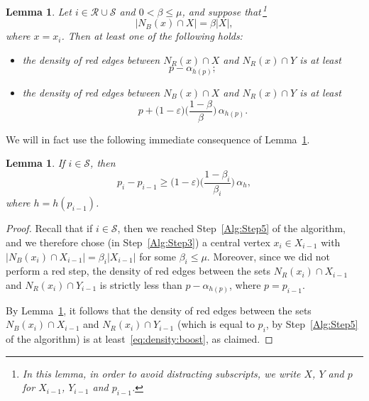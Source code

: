 \documentclass[12pt,reqno]{amsart}
\newtheorem{lemma}[theorem]{Lemma}
\theoremstyle{definition}
\theoremstyle{remark}
\def\cS{\mathcal{S}}
\newcommand\eps{\varepsilon}
\renewcommand{\le}{\leqslant}
\renewcommand{\ge}{\geqslant}
\def\eps{\varepsilon}
\def\cR{\mathcal{R}}
\begin{document}
\begin{lemma}\label{lem:density:boost:steps:boost:the:density}
Let $i \in \cR \cup \cS$ and $0 < \beta \le \mu$, and suppose that\,\footnote{In this lemma, in order to avoid distracting subscripts, we write $X$, $Y$ and $p$ for $X_{i-1}$, $Y_{i-1}$ and $p_{i-1}$.}
$$|N_B(x) \cap X| = \beta |X|,$$
where $x = x_i$. Then %
at least one of the following holds: 
\begin{itemize}
\item[$(a)$] the density of red edges between $N_R(x) \cap X$ and $N_R(x) \cap Y$ is at least 
$$p - \alpha_{h(p)};$$ 
\item[$(b)$] the density of red edges between $N_B(x) \cap X$ and $N_R(x) \cap Y$ is at least 
\begin{equation}\label{eq:density:boost}
p + \big(1 - \eps \big) \bigg( \frac{1-\beta}{\beta} \bigg) \, \alpha_{h(p)}.
\end{equation}
\end{itemize}
\end{lemma}


We will in fact use the following immediate consequence of Lemma~\ref{lem:density:boost:steps:boost:the:density}.

\begin{lemma}\label{lem:density:boost:steps:boost:the:density:notation}
If\/ $i \in \cS$, then 
$$p_i - p_{i-1} \ge \big(1 - \eps \big) \bigg( \frac{1-\beta_i}{\beta_i} \bigg) \, \alpha_h,$$
where $h = h(p_{i-1})$. %
\end{lemma}

\begin{proof}
Recall that if $i \in \cS$, then we reached Step~\ref{Alg:Step5} of the algorithm, and we therefore chose (in Step~\ref{Alg:Step3}) a central vertex $x_i \in X_{i-1}$ with $|N_B(x_i) \cap X_{i-1}| = \beta_i |X_{i-1}|$ for some $\beta_i \le \mu$. Moreover, since we did not perform a red step, the density of red edges between the sets $N_R(x_i) \cap X_{i-1}$ and $N_R(x_i) \cap Y_{i-1}$ is strictly less than $p - \alpha_{h(p)}$, where $p = p_{i-1}$. 

By Lemma~\ref{lem:density:boost:steps:boost:the:density}, it follows that the density of red edges between the sets $N_B(x_i) \cap X_{i-1}$ and $N_R(x_i) \cap Y_{i-1}$ (which is equal to $p_i$, by Step~\ref{Alg:Step5} of the algorithm) is at least~\eqref{eq:density:boost}, as claimed.
\end{proof}
\end{document}
